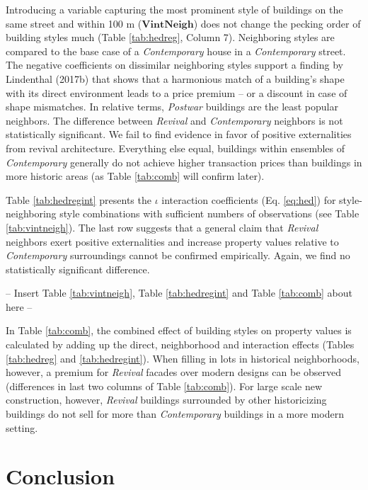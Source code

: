 \documentclass[]{article}
\begin{document}
Introducing a variable capturing the most prominent style of buildings
on the same street and within 100 m (\(\mathbf{VintNeigh}\)) does not
change the pecking order of building styles much (Table
\ref{tab:hedreg}, Column 7). Neighboring styles are compared to the base
case of a \emph{Contemporary} house in a \emph{Contemporary} street. The
negative coefficients on dissimilar neighboring styles support a finding
by Lindenthal (2017b) that shows that a harmonious match of a building's
shape with its direct environment leads to a price premium -- or a
discount in case of shape mismatches. In relative terms, \emph{Postwar}
buildings are the least popular neighbors. The difference between
\emph{Revival} and \emph{Contemporary} neighbors is not statistically
significant. We fail to find evidence in favor of positive externalities
from revival architecture. Everything else equal, buildings within
ensembles of \emph{Contemporary} generally do not achieve higher
transaction prices than buildings in more historic areas (as Table
\ref{tab:comb} will confirm later).

Table \ref{tab:hedregint} presents the \(\iota\) interaction
coefficients (Eq. \ref{eq:hed}) for style-neighboring style combinations
with sufficient numbers of observations (see Table \ref{tab:vintneigh}).
The last row suggests that a general claim that \emph{Revival} neighbors
exert positive externalities and increase property values relative to
\emph{Contemporary} surroundings cannot be confirmed empirically. Again,
we find no statistically significant difference.

\begin{center}
  -- Insert  Table \ref{tab:vintneigh}, Table \ref{tab:hedregint} and Table \ref{tab:comb} about here --
\end{center}

In Table \ref{tab:comb}, the combined effect of building styles on
property values is calculated by adding up the direct, neighborhood and
interaction effects (Tables \ref{tab:hedreg} and \ref{tab:hedregint}).
When filling in lots in historical neighborhoods, however, a premium for
\emph{Revival} facades over modern designs can be observed (differences
in last two columns of Table \ref{tab:comb}). For large scale new
construction, however, \emph{Revival} buildings surrounded by other
historicizing buildings do not sell for more than \emph{Contemporary}
buildings in a more modern setting.

\hypertarget{conclusion}{%
\section{Conclusion}\label{conclusion}}
\end{document}
